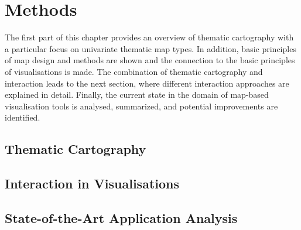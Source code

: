 \section{Methods}
\label{s:methods}
The first part of this chapter provides an overview of thematic cartography with a particular focus on univariate thematic map types. In addition, basic principles of map design and methods are shown and the connection to the basic principles of visualisations is made.
The combination of thematic cartography and interaction leads to the next section, where different interaction approaches are explained in detail. Finally, the current state in the domain of map-based visualisation tools is analysed, summarized, and potential improvements are identified.

\subsection{Thematic Cartography}
\label{s:cartography}


%   

\subsection{Interaction in Visualisations}
\label{s:interaction}


\subsection{State-of-the-Art Application Analysis}
